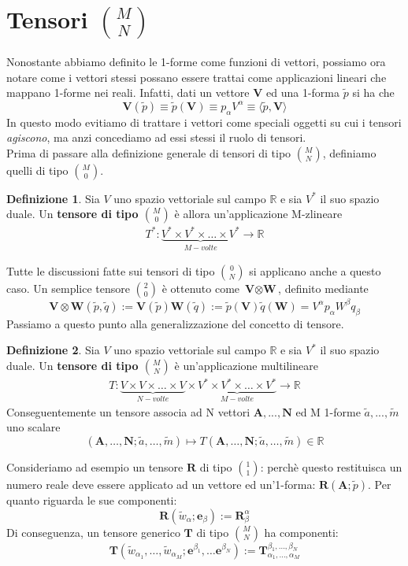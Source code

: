 \documentclass[a4paper,11pt]{book}
\theoremstyle{plain}
\theoremstyle{definition}
\newtheorem{defn}{Definizione}[chapter]
\begin{document}
\section{Tensori $\binom{M}{N}$}
Nonostante abbiamo definito le 1-forme come funzioni di vettori, possiamo ora notare come i vettori stessi possano essere trattai come applicazioni lineari che mappano 1-forme nei reali. Infatti, dati un vettore $\textbf{V}$ ed una 1-forma $\tilde{p}$ si ha che
\[
\textbf{V}(\tilde{p}) \equiv \tilde{p}(\textbf{V}) \equiv p_{\alpha}V^{\alpha} \equiv \langle \tilde{p},\textbf{V} \rangle
\]
In questo modo evitiamo di trattare i vettori come speciali oggetti su cui i tensori \emph{agiscono}, ma anzi concediamo ad essi stessi il ruolo di tensori. 
\\
Prima di passare alla definizione generale di tensori di tipo $\binom{M}{N}$, definiamo quelli di tipo $\binom{M}{0}$. 
\begin{defn}
Sia $V$ uno spazio vettoriale sul campo $\mathbb{R}$ e sia $V^*$ il suo spazio duale. Un \textbf{tensore di tipo $\binom{M}{0}$} è allora un'applicazione M-zlineare
\[
\begin{matrix} T^*:\underbrace{ V^*\times V^* \times \ldots \times V^* }_{M-volte} \to \mathbb{R}\end{matrix} 
\]
\end{defn}
Tutte le discussioni fatte sui tensori di tipo $\binom{0}{N}$ si applicano anche a questo caso. Un semplice tensore $\binom{2}{0}$ è ottenuto come $\textbf{V}\otimes\textbf{W}$, definito mediante
\[
\textbf{V}\otimes\textbf{W}(\tilde{p},\tilde{q}) := \textbf{V}(\tilde{p})\textbf{W}(\tilde{q}) := \tilde{p}(\textbf{V})\tilde{q}(\textbf{W}) = V^{\alpha}p_{\alpha}W^{\beta}q_{\beta}
\]
Passiamo a questo punto alla generalizzazione del concetto di tensore. 
\begin{defn}
Sia $V$ uno spazio vettoriale sul campo $\mathbb{R}$ e sia $V^*$ il suo spazio duale. Un \textbf{tensore di tipo $\binom{M}{N}$} è un'applicazione multilineare
\[
\begin{matrix} T:\underbrace{V\times V\times \ldots \times V}_{N-volte}\times\underbrace{ V^*\times V^* \times \ldots \times V^* }_{M-volte} \to \mathbb{R}\end{matrix}
\]
Conseguentemente un tensore associa ad N vettori $\textbf{A},...,\textbf{N}$ ed M 1-forme $\tilde{a},...,\tilde{m}$ uno scalare
\[
(\textbf{A},\ldots,\textbf{N};\tilde{a},\ldots,\tilde{m})\mapsto T(\textbf{A},\ldots,\textbf{N};\tilde{a},\ldots,\tilde{m}) \in \mathbb{R}
\]
\end{defn}
Consideriamo ad esempio un tensore $\textbf{R}$ di tipo $\binom{1}{1}$: perchè questo restituisca un numero reale deve essere applicato ad un vettore ed un'1-forma: $\textbf{R}(\textbf{A};\tilde{p})$. Per quanto riguarda le sue componenti:
\[
\textbf{R}(\tilde{w}_{\alpha};\textbf{e}_{\beta}) := \textbf{R}_{\beta}^{\alpha}
\]
Di conseguenza, un tensore generico $\textbf{T}$ di tipo $\binom{M}{N}$ ha componenti:
\[
\textbf{T}(\tilde{w}_{\alpha_1},\ldots,\tilde{w}_{\alpha_M}; \textbf{e}^{\beta_1},\ldots \textbf{e}^{\beta_N}):=\textbf{T}_{\alpha_1,\ldots,\alpha_M}^{\beta_1,\ldots,\beta_N}
\]
\end{document}

